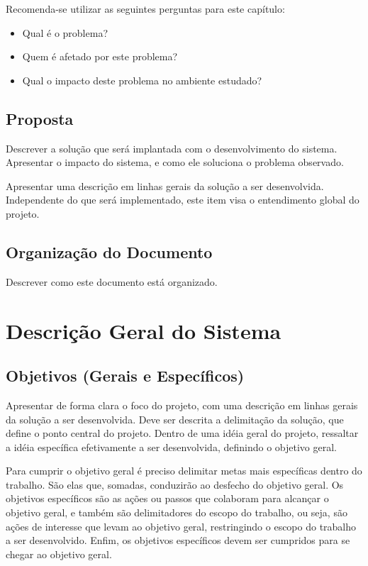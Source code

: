 \documentclass[a4paper,12pt]{article}
\begin{document}
Recomenda-se utilizar as seguintes perguntas para este capítulo:

\begin{itemize}
  \item Qual é o problema?
  \item Quem é afetado por este problema?
  \item Qual o impacto deste problema no ambiente estudado?
\end{itemize}

\subsection{Proposta}
Descrever a solução que será implantada com o desenvolvimento do sistema. Apresentar o impacto do sistema, e como ele soluciona o problema observado.

Apresentar uma descrição em linhas gerais da solução a ser desenvolvida. Independente do que será implementado, este item visa o entendimento global do projeto.

\subsection{Organização do Documento}
Descrever como este documento está organizado.

\newpage
\section{Descrição Geral do Sistema}
\subsection{Objetivos (Gerais e Específicos)}

Apresentar de forma clara o foco do projeto, com uma descrição em linhas gerais da solução a ser desenvolvida. Deve ser descrita a delimitação da solução, que define o ponto central do projeto. Dentro de uma idéia geral do projeto, ressaltar a idéia específica efetivamente a ser desenvolvida, definindo o objetivo geral.

Para cumprir o objetivo geral é preciso delimitar metas mais específicas dentro do trabalho. São elas que, somadas, conduzirão ao desfecho do objetivo geral. Os objetivos específicos são as ações ou passos que colaboram para alcançar o objetivo geral, e também são delimitadores do escopo do trabalho, ou seja, são ações de interesse que levam ao objetivo geral, restringindo o escopo do trabalho a ser desenvolvido. Enfim, os objetivos específicos devem ser cumpridos para se chegar ao objetivo geral.
\end{document}
